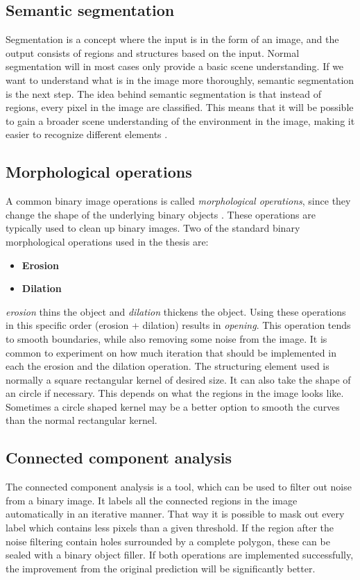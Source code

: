 \documentclass[USenglish]{ifimaster}  %
\begin{document}
\subsection{Semantic segmentation}
Segmentation is a concept where the input is in the form of an image, and the output consists of regions and structures based on the input. Normal segmentation will in most cases only provide a basic scene understanding. If we want to understand what is in the image more thoroughly, semantic segmentation is the next step. The idea behind semantic segmentation is that instead of regions, every pixel in the image are classified. This means that it will be possible to gain a broader scene understanding of the environment in the image, making it easier to recognize different elements \cite{website:semantic_segmentation}.

\subsection{Morphological operations}
A common binary image operations is called \textit{morphological operations}, since
they change the shape of the underlying binary objects \cite{Ritter}. These operations are typically used to clean up binary images. Two of the standard binary morphological operations used in the thesis are: 
\newline
\begin{itemize}
    \item \textbf{Erosion}
    \item \textbf{Dilation}
\end{itemize}

\textit{erosion} thins the object and \textit{dilation} thickens the object. Using these operations in this specific order (erosion + dilation) results in \textit{opening}. This operation tends to smooth boundaries, while also removing some noise from the image. It is common to experiment on how much iteration that should be implemented in each the erosion and the dilation operation.
\newline
\newline
The structuring element used is normally a square rectangular kernel of desired size. It can also take the shape of an circle if necessary. This depends on what the regions in the image looks like. Sometimes a circle shaped kernel may be a better option to smooth the curves than the normal rectangular kernel.

\subsection{Connected component analysis}
The connected component analysis is a tool, which can be used to filter out noise from a binary image. It labels all the connected regions in the image automatically in an iterative manner. That way it is possible to mask out every label which contains less pixels than a given threshold. If the region after the noise filtering contain holes surrounded by a complete polygon, these can be sealed with a binary object filler. If both operations are implemented successfully, the improvement from the original prediction will be significantly better.
\end{document}
